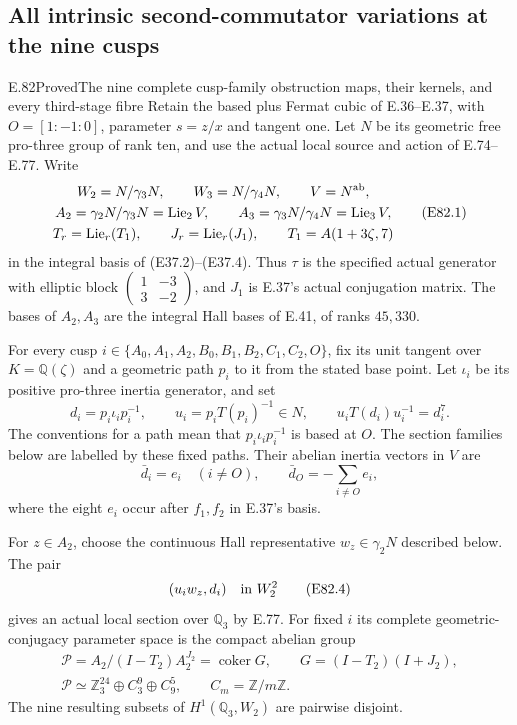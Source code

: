 \subsection{All intrinsic second-commutator variations at the nine cusps}

\begin{statement}{E.82}{Proved}{The nine complete cusp-family obstruction maps, their kernels, and every third-stage fibre}
Retain the based plus Fermat cubic of E.36--E.37, with
$O=[1:-1:0]$, parameter $s=z/x$ and tangent one.
Let $N$ be its geometric free pro-three group of rank ten,
and use the actual local source and action of E.74--E.77.
Write
\[
 \begin{gathered}
 W_2=N/\gamma_3N,\qquad W_3=N/\gamma_4N,\qquad
 V=N^{\rm ab},\\
 A_2=\gamma_2N/\gamma_3N=\operatorname{Lie}_2V,
 \qquad A_3=\gamma_3N/\gamma_4N=\operatorname{Lie}_3V,\\
 T_r=\operatorname{Lie}_r(T_1),\qquad
 J_r=\operatorname{Lie}_r(J_1),\qquad
 T_1=A(1+3\zeta,7)
 \end{gathered}
 \tag{E82.1}
\]
in the integral basis of (E37.2)--(E37.4). Thus $\tau$
is the specified actual generator with elliptic block
$\left(\begin{smallmatrix}1&-3\\3&-2\end{smallmatrix}\right)$,
and $J_1$ is E.37's actual conjugation matrix.
The bases of $A_2,A_3$ are the integral Hall bases of
E.41, of ranks $45,330$.

For every cusp $i\in\{A_0,A_1,A_2,B_0,B_1,B_2,C_1,C_2,O\}$,
fix its unit tangent over $K=\mathbb Q(\zeta)$ and a
geometric path $p_i$ to it from the stated base point.
Let $\iota_i$ be its positive pro-three inertia generator,
and set
\[
 d_i=p_i\iota_i p_i^{-1},\qquad
 u_i=p_iT(p_i)^{-1}\in N,
 \qquad u_iT(d_i)u_i^{-1}=d_i^7.
 \tag{E82.2}
\]
The conventions for a path mean that
$p_i\iota_i p_i^{-1}$ is based at $O$.
The section families below are labelled by these fixed paths.
Their abelian inertia vectors in $V$ are
\[
 \bar d_i=e_i\quad(i\ne O),\qquad
 \bar d_O=-\sum_{i\ne O}e_i,
 \tag{E82.3}
\]
where the eight $e_i$ occur after $f_1,f_2$ in E.37's basis.

For $z\in A_2$, choose the continuous Hall representative
$w_z\in\gamma_2N$ described below. The pair
\[
           (u_iw_z,d_i)\quad\hbox{in }W_2^2
 \tag{E82.4}
\]
gives an actual local section over $\mathbb Q_3$ by E.77.
For fixed $i$ its complete geometric-conjugacy parameter
space is the compact abelian group
\[
 \begin{gathered}
 \mathcal P=A_2/(I-T_2)A_2^{J_2}
    =\operatorname{coker}G,
       \qquad G=(I-T_2)(I+J_2),\\
 \mathcal P\simeq
       \mathbb Z_3^{24}\oplus C_3^9\oplus C_9^5,
       \qquad C_m=\mathbb Z/m\mathbb Z.
 \end{gathered}
 \tag{E82.5}
\]
The nine resulting subsets of $H^1(\mathbb Q_3,W_2)$
are pairwise disjoint.


\end{statement}
